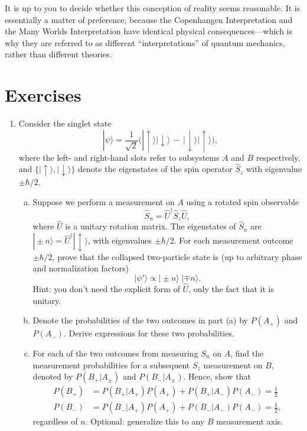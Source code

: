 \documentclass[prx,12pt]{revtex4-2}
\begin{document}
It is up to you to decide whether this conception of reality seems
reasonable.  It is essentially a matter of preference, because the
Copenhangen Interpretation and the Many Worlds Interpretation have
identical physical consequences---which is why they are referred to as
different ``interpretations'' of quantum mechanics, rather than
different theories.


\section*{Exercises}

\begin{enumerate}

\item \label{ex:singletproperties}
Consider the singlet state
\begin{equation}
  |\psi\rangle = \frac{1}{\sqrt{2}} \Big(|\!\uparrow\rangle|\!\downarrow\rangle \,-\, |\!\downarrow\rangle|\!\uparrow\rangle\Big),
\end{equation}
where the left- and right-hand slots refer to subsystems $A$ and $B$
respectively, and $\{|\!\uparrow\rangle, |\!\downarrow\rangle\}$
denote the eigenstates of the spin operator $\hat{S}_z$ with
eigenvalue $\pm\hbar/2$.
\begin{enumerate}[(a)]
\item Suppose we perform a measurement on $A$ using a rotated spin
  observable
\begin{equation}
  \hat{S}_n = \hat{U}^\dagger \hat{S}_z \hat{U},
\end{equation}
where $\hat{U}$ is a unitary rotation matrix.  The eigenstates of
$\hat{S}_n$ are $|\!\pm n\rangle = \hat{U}^\dagger |\!\updownarrow\rangle$, with
eigenvalues $\pm \hbar/2$.  For each measurement outcome $\pm\hbar/2$,
prove that the collapsed two-particle state is (up to arbitrary phase
and normalization factors)
\begin{equation}
  |\psi'\rangle \propto |\pm \!n \rangle\; |\mp\! n\rangle.
\end{equation}
Hint: you don't need the explicit form of $\hat{U}$, only the fact
that it is unitary.

\item Denote the probabilities of the two outcomes in part (a) by
  $P(A_+)$ and $P(A_-)$.  Derive expressions for these two
  probabilities.

\item For each of the two outcomes from measuring $S_n$ on $A$, find
  the measurement probabilities for a subsequent $S_z$ measurement on
  $B$, denoted by $P(B_+|A_\pm)$ and $P(B_-|A_\pm)$.  Hence, show that
  \begin{align}
    P(B_+) &= P(B_+|A_+) P(A_+) + P(B_+|A_-) P(A_-) = \frac{1}{2}\\
    P(B_-) &= P(B_-|A_+) P(A_+) + P(B_-|A_-) P(A_-) = \frac{1}{2},
  \end{align}
  regardless of $n$.  Optional: generalize this to any $B$ measurement
  axis.


\end{enumerate}
\end{enumerate}
\end{document}
